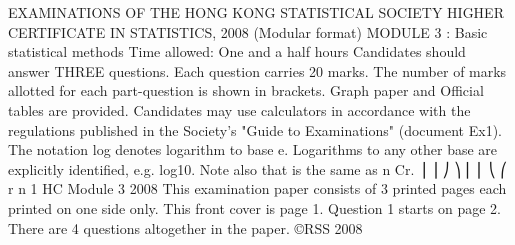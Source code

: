 EXAMINATIONS OF THE HONG KONG STATISTICAL SOCIETY
HIGHER CERTIFICATE IN STATISTICS, 2008
(Modular format)
MODULE 3 : Basic statistical methods
Time allowed: One and a half hours
Candidates should answer THREE questions.
Each question carries 20 marks.
The number of marks allotted for each part-question is shown in brackets.
Graph paper and Official tables are provided.
Candidates may use calculators in accordance with the regulations published in
the Society's "Guide to Examinations" (document Ex1).
The notation log denotes logarithm to base e.
Logarithms to any other base are explicitly identified, e.g. log10.
Note also that is the same as n
Cr. ⎟
⎟
⎠
⎞
⎜
⎜
⎝
⎛
r
n
 1 HC Module 3 2008
This examination paper consists of 3 printed pages each printed on one side only.
This front cover is page 1.
Question 1 starts on page 2.
There are 4 questions altogether in the paper.
©RSS 2008 

